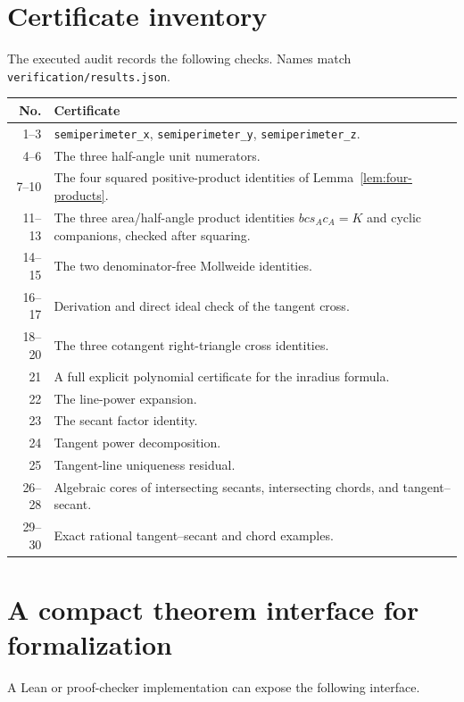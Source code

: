 \documentclass[11pt,letterpaper]{article}
\theoremstyle{definition}
\theoremstyle{remark}
\newcommand{\code}[1]{\texttt{#1}}
\begin{document}
\appendix

\section{Certificate inventory}
\label{app:certificates}

The executed audit records the following checks.  Names match
\code{verification/results.json}.

\begin{longtable}{r p{}}
\toprule
No. & Certificate \\
\midrule
\endhead
1--3 & \code{semiperimeter\_x}, \code{semiperimeter\_y},
\code{semiperimeter\_z}. \\
4--6 & The three half-angle unit numerators. \\
7--10 & The four squared positive-product identities of
Lemma~\ref{lem:four-products}. \\
11--13 & The three area/half-angle product identities
\(bc s_Ac_A=K\) and cyclic companions, checked after squaring. \\
14--15 & The two denominator-free Mollweide identities. \\
16--17 & Derivation and direct ideal check of the tangent cross. \\
18--20 & The three cotangent right-triangle cross identities. \\
21 & A full explicit polynomial certificate for the inradius formula. \\
22 & The line-power expansion. \\
23 & The secant factor identity. \\
24 & Tangent power decomposition. \\
25 & Tangent-line uniqueness residual. \\
26--28 & Algebraic cores of intersecting secants, intersecting chords, and
tangent--secant. \\
29--30 & Exact rational tangent--secant and chord examples. \\
\bottomrule
\end{longtable}

\section{A compact theorem interface for formalization}
\label{app:interface}

A Lean or proof-checker implementation can expose the following interface.
\end{document}
